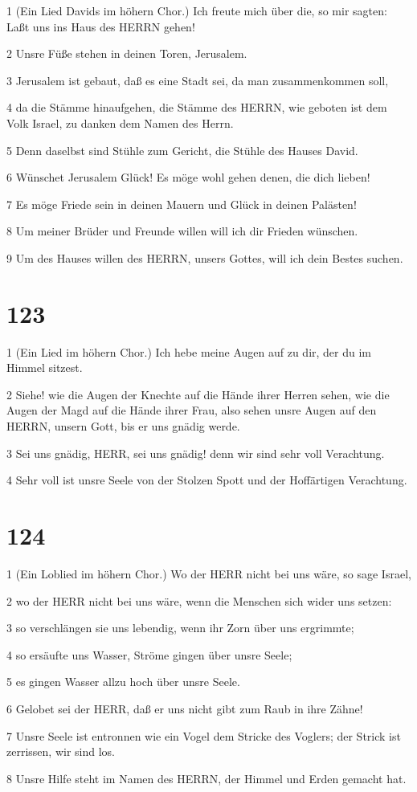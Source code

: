 \par 1 (Ein Lied Davids im höhern Chor.) Ich freute mich über die, so mir sagten: Laßt uns ins Haus des HERRN gehen!
\par 2 Unsre Füße stehen in deinen Toren, Jerusalem.
\par 3 Jerusalem ist gebaut, daß es eine Stadt sei, da man zusammenkommen soll,
\par 4 da die Stämme hinaufgehen, die Stämme des HERRN, wie geboten ist dem Volk Israel, zu danken dem Namen des Herrn.
\par 5 Denn daselbst sind Stühle zum Gericht, die Stühle des Hauses David.
\par 6 Wünschet Jerusalem Glück! Es möge wohl gehen denen, die dich lieben!
\par 7 Es möge Friede sein in deinen Mauern und Glück in deinen Palästen!
\par 8 Um meiner Brüder und Freunde willen will ich dir Frieden wünschen.
\par 9 Um des Hauses willen des HERRN, unsers Gottes, will ich dein Bestes suchen.

\chapter{123}

\par 1 (Ein Lied im höhern Chor.) Ich hebe meine Augen auf zu dir, der du im Himmel sitzest.
\par 2 Siehe! wie die Augen der Knechte auf die Hände ihrer Herren sehen, wie die Augen der Magd auf die Hände ihrer Frau, also sehen unsre Augen auf den HERRN, unsern Gott, bis er uns gnädig werde.
\par 3 Sei uns gnädig, HERR, sei uns gnädig! denn wir sind sehr voll Verachtung.
\par 4 Sehr voll ist unsre Seele von der Stolzen Spott und der Hoffärtigen Verachtung.

\chapter{124}

\par 1 (Ein Loblied im höhern Chor.) Wo der HERR nicht bei uns wäre, so sage Israel,
\par 2 wo der HERR nicht bei uns wäre, wenn die Menschen sich wider uns setzen:
\par 3 so verschlängen sie uns lebendig, wenn ihr Zorn über uns ergrimmte;
\par 4 so ersäufte uns Wasser, Ströme gingen über unsre Seele;
\par 5 es gingen Wasser allzu hoch über unsre Seele.
\par 6 Gelobet sei der HERR, daß er uns nicht gibt zum Raub in ihre Zähne!
\par 7 Unsre Seele ist entronnen wie ein Vogel dem Stricke des Voglers; der Strick ist zerrissen, wir sind los.
\par 8 Unsre Hilfe steht im Namen des HERRN, der Himmel und Erden gemacht hat.

